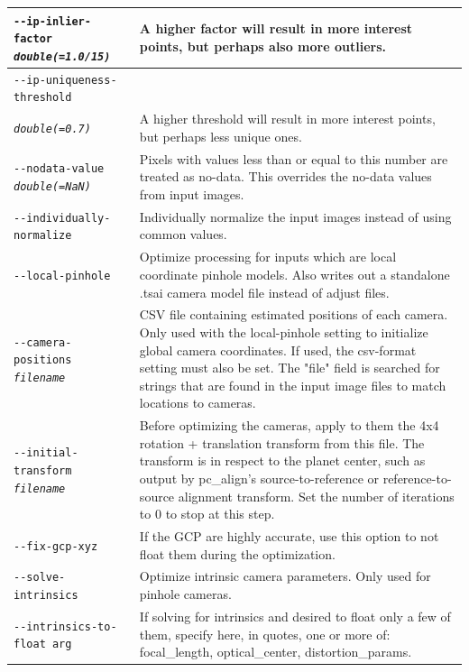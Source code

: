 \begin{longtable}{|l|p{8.0cm}|}
\texttt{-\/-ip-inlier-factor \textit{double(=1.0/15)}} & 
A higher factor will result in more interest points, but perhaps also more outliers.
\\ \hline

\texttt{-\/-ip-uniqueness-threshold} \\
\texttt{\textit{double(=0.7)}} & 
A higher threshold will result in more interest points, but perhaps less unique ones.
\\ \hline

\texttt{-\/-nodata-value \textit{double(=NaN)}} & 
Pixels with values less than or equal to this number are treated as no-data. This overrides the no-data values from input images.
\\ \hline

\texttt{-\/-individually-normalize} & Individually normalize the input images instead of using common values.
\\ \hline

\texttt{-\/-local-pinhole} & Optimize processing for inputs which are local coordinate 
pinhole models.
Also writes out a standalone .tsai camera model file instead of adjust files. 
\\ \hline

\texttt{-\/-camera-positions \textit{filename}} & CSV file containing estimated positions of each camera.
Only used with the local-pinhole setting to initialize global camera coordinates. If used,
the csv-format setting must also be set.  The "file" field is searched for strings that are found
in the input image files to match locations to cameras.\\ \hline


\texttt{-\/-initial-transform \textit{filename}} & Before optimizing the cameras, apply to them the 4x4 rotation + translation transform from this file. The transform is in respect to the planet center, such as output by pc\_align's source-to-reference or reference-to-source alignment transform. Set the number of iterations to 0 to stop at this step. \\ \hline

\texttt{-\/-fix-gcp-xyz} & If the GCP are highly accurate, use this option to not float them during the optimization.\\ \hline

\texttt{-\/-solve-intrinsics} & Optimize intrinsic camera parameters. Only used for pinhole cameras.\\ \hline

\texttt{-\/-intrinsics-to-float arg} & If solving for intrinsics and desired to float only a few of them, specify here, in quotes, one or more of: focal\_length, optical\_center, distortion\_params.\\ \hline


\end{longtable}
